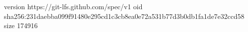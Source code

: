 version https://git-lfs.github.com/spec/v1
oid sha256:231daebba099f91480e295cd1c3cb8ea0e72a531b77d3b0db1fa1de7e32ccd58
size 174916
